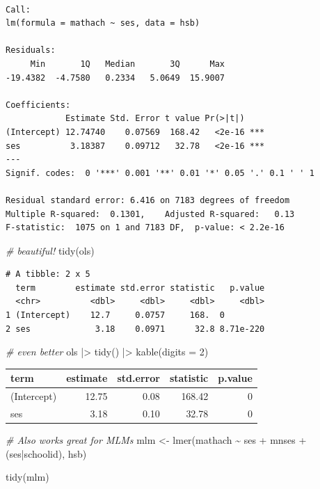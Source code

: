 \documentclass[
  letterpaper,
  DIV=11,
  numbers=noendperiod]{scrreprt}
\newenvironment{Shaded}{\begin{snugshade}}{\end{snugshade}}
\newcommand{\AttributeTok}[1]{\textcolor[rgb]{0.49,0.56,0.16}{#1}}
\newcommand{\CommentTok}[1]{\textcolor[rgb]{0.38,0.63,0.69}{\textit{#1}}}
\newcommand{\DecValTok}[1]{\textcolor[rgb]{0.25,0.63,0.44}{#1}}
\newcommand{\FunctionTok}[1]{\textcolor[rgb]{0.02,0.16,0.49}{#1}}
\newcommand{\NormalTok}[1]{\textcolor[rgb]{0.00,0.44,0.13}{#1}}
\newcommand{\OtherTok}[1]{\textcolor[rgb]{0.00,0.44,0.13}{#1}}
\newcommand{\SpecialCharTok}[1]{\textcolor[rgb]{0.25,0.44,0.63}{#1}}
\begin{document}
\begin{verbatim}

Call:
lm(formula = mathach ~ ses, data = hsb)

Residuals:
     Min       1Q   Median       3Q      Max 
-19.4382  -4.7580   0.2334   5.0649  15.9007 

Coefficients:
            Estimate Std. Error t value Pr(>|t|)    
(Intercept) 12.74740    0.07569  168.42   <2e-16 ***
ses          3.18387    0.09712   32.78   <2e-16 ***
---
Signif. codes:  0 '***' 0.001 '**' 0.01 '*' 0.05 '.' 0.1 ' ' 1

Residual standard error: 6.416 on 7183 degrees of freedom
Multiple R-squared:  0.1301,    Adjusted R-squared:   0.13 
F-statistic:  1075 on 1 and 7183 DF,  p-value: < 2.2e-16
\end{verbatim}

\begin{Shaded}
\begin{Highlighting}[]
\CommentTok{\# beautiful!}
\FunctionTok{tidy}\NormalTok{(ols)}
\end{Highlighting}
\end{Shaded}

\begin{verbatim}
# A tibble: 2 x 5
  term        estimate std.error statistic   p.value
  <chr>          <dbl>     <dbl>     <dbl>     <dbl>
1 (Intercept)    12.7     0.0757     168.  0        
2 ses             3.18    0.0971      32.8 8.71e-220
\end{verbatim}

\begin{Shaded}
\begin{Highlighting}[]
\CommentTok{\# even better}
\NormalTok{ols }\SpecialCharTok{|\textgreater{}} \FunctionTok{tidy}\NormalTok{() }\SpecialCharTok{|\textgreater{}} \FunctionTok{kable}\NormalTok{(}\AttributeTok{digits =} \DecValTok{2}\NormalTok{)}
\end{Highlighting}
\end{Shaded}

\begin{longtable}[]{@{}lrrrr@{}}
\toprule\noalign{}
term & estimate & std.error & statistic & p.value \\
\midrule\noalign{}
\endhead
\bottomrule\noalign{}
\endlastfoot
(Intercept) & 12.75 & 0.08 & 168.42 & 0 \\
ses & 3.18 & 0.10 & 32.78 & 0 \\
\end{longtable}

\begin{Shaded}
\begin{Highlighting}[]
\CommentTok{\# Also works great for MLMs}
\NormalTok{mlm }\OtherTok{\textless{}{-}} \FunctionTok{lmer}\NormalTok{(mathach }\SpecialCharTok{\textasciitilde{}}\NormalTok{ ses }\SpecialCharTok{+}\NormalTok{ mnses }\SpecialCharTok{+}\NormalTok{ (ses}\SpecialCharTok{|}\NormalTok{schoolid), hsb)}

\FunctionTok{tidy}\NormalTok{(mlm)}
\end{Highlighting}
\end{Shaded}
\end{document}
